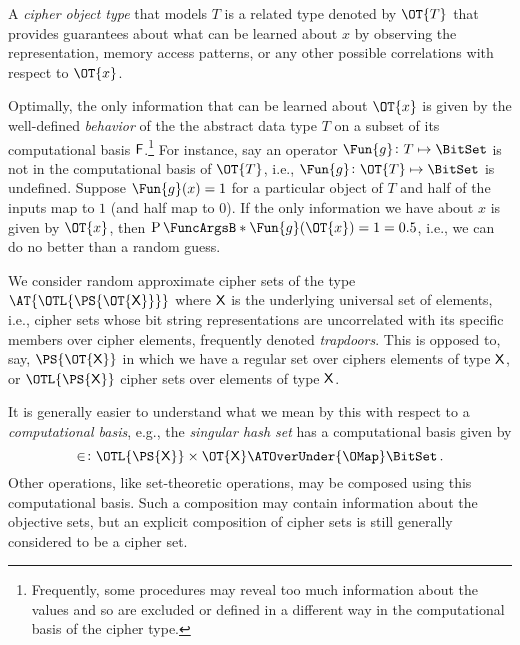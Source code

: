 \documentclass[ ../main.tex]{subfiles}
\begin{document}
A \emph{cipher object type}\cite{obtype} that models $T$ is a related type denoted by $\OT{T}$ that provides guarantees about what can be learned about $x$ by observing the representation, memory access patterns, or any other possible correlations with respect to $\OT{x}$.

Optimally, the only information that can be learned about $\OT{x}$ is given by the well-defined \emph{behavior} of the the abstract data type $T$ on a subset of its computational basis $\Set{F}$.\footnote{
Frequently, some procedures may reveal too much information about the values and so are excluded or defined in a different way in the computational basis of the cipher type.}
For instance, say an operator $\Fun{g} \colon T \mapsto \BitSet$ is not in the computational basis of $\OT{T}$, i.e., $\Fun{g} \colon \OT{T} \mapsto \BitSet$ is undefined.
Suppose $\Fun{g}(x) = 1$ for a particular object of $T$ and half of the inputs map to $1$ (and half map to $0$).
If the only information we have about $x$ is given by $\OT{x}$, then $\Prob{\Fun{g}(\OT{x})=1} = 0.5$, i.e., we can do no better than a random guess.

We consider random approximate cipher sets of the type $\AT{\OTL{\PS{\OT{\Set{X}}}}}$ where $\Set{X}$ is the underlying universal set of elements, i.e., cipher sets whose bit string representations are uncorrelated with its specific members over cipher elements, frequently denoted \emph{trapdoors}.
This is opposed to, say, $\PS{\OT{\Set{X}}}$ in which we have a regular set over ciphers elements of type $\Set{X}$, or $\OTL{\PS{\Set{X}}}$ cipher sets over elements of type $\Set{X}$.

It is generally easier to understand what we mean by this with respect to a \emph{computational basis}, e.g., the 
\emph{singular hash set} has a computational basis given by
\begin{equation}
	\SetContains \colon \OTL{\PS{\Set{X}}} \times \OT{\Set{X}} \ATOverUnder{\OMap} \BitSet\,.
\end{equation}
Other operations, like set-theoretic operations, may be composed using this computational basis.
Such a composition may contain information about the objective sets, but an explicit composition of cipher sets is still generally considered to be a cipher set.
\end{document}
